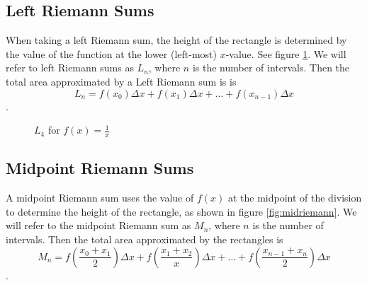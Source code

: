 \subsection{Left Riemann Sums}
When taking a left Riemann sum, the height of the rectangle is determined by the value of the function at the lower (left-most) $x$-value. See figure \ref{fig:leftriemann}. We will refer to left Riemann sums as $L_n$, where $n$ is the number of intervals. Then the total area approximated by a Left Riemann sum is is $$L_n = f(x_0)\Delta x + f(x_1)\Delta x + \ldots + f(x_{n-1})\Delta x$$.

\begin{figure}
    \centering
    \caption{$L_4$ for $f(x)=\frac{1}{x}$}
    \label{fig:leftriemann}
\end{figure}


\subsection{Midpoint Riemann Sums}
A midpoint Riemann sum uses the value of $f(x)$ at the midpoint of the division to determine the height of the rectangle, as shown in figure \ref{fig:midriemann}. We will refer to the midpoint Riemann sum as $M_n$, where $n$ is the number of intervals. Then the total area approximated by the rectangles is $$M_n = f(\frac{x_0+x_1}{2})\Delta x + f(\frac{x_1+x_2}{x})\Delta x + \ldots + f(\frac{x_{n-1}+x_n}{2})\Delta x$$.

